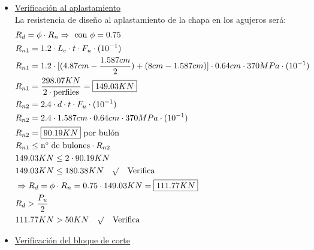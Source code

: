 \begin{enumerate}
\begin{itemize}
\item \underline{Verificación al aplastamiento}\\
La resistencia de diseño al aplastamiento de la chapa en los agujeros será:
\begin{align*}
& R_d = \phi \cdot R_n \Rightarrow \text{ con } \phi = 0.75\\
& R_{n1} = 1.2 \cdot L_c \cdot t \cdot F_u \cdot (10^{-1})\\
& R_{n1} = 1.2 \cdot [(4.87cm - \frac{1.587cm}{2})+ (8cm - 1.587cm)]\cdot 0.64cm \cdot 370MPa \cdot (10^{-1})\\
& R_{n1} = \frac{298.07KN}{2 \cdot \text{perfiles}} = \framebox{$149.03 KN$}\\
& R_{n2} = 2.4 \cdot d \cdot t \cdot F_u \cdot (10^{-1})\\
& R_{n2} = 2.4 \cdot 1.587cm \cdot 0.64cm \cdot 370MPa \cdot (10^{-1})\\
& R_{n2} = \framebox{$90.19 KN$} \text{ por bulón}\\
& R_{n1} \leq \text{n° de bulones} \cdot R_{n2}\\
& 149.03 KN \leq 2 \cdot 90.19 KN\\
& 149.03 KN \leq 180.38 KN \quad \surd \quad \text{Verifica}\\
& \Rightarrow R_d = \phi \cdot R_n = 0.75 \cdot 149.03 KN = \framebox{$111.77 KN$}\\
& R_d > \frac{P_u}{2}\\
& 111.77 KN > 50 KN \quad \surd \quad \text{Verifica}
\end{align*}

\item \underline{Verificación del bloque de corte}


\end{itemize}
\end{enumerate}

